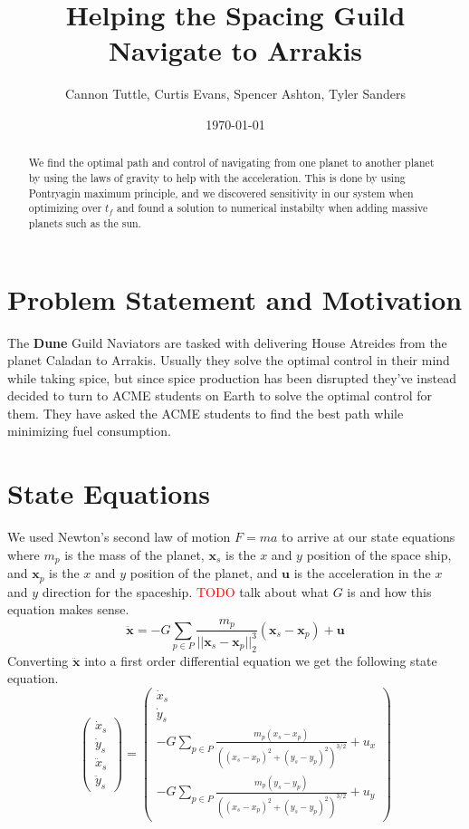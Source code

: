 \documentclass[11pt]{amsart}
\begin{document}
\title{Helping the Spacing Guild Navigate to Arrakis}
\author{Cannon Tuttle, Curtis Evans, Spencer Ashton, Tyler Sanders}

\date{\today}

\begin{abstract}
    We find the optimal path and control of navigating from one planet to another planet by using the laws of gravity to help with 
    the acceleration. This is done by using Pontryagin maximum principle, and we discovered sensitivity in our system when optimizing over $t_f$ and found a solution to numerical instabilty when 
    adding massive planets such as the sun. 
\end{abstract}

\maketitle

\section{Problem Statement and Motivation}
The \textbf{Dune} Guild Naviators are tasked with delivering House Atreides from the planet Caladan to Arrakis. Usually they solve the optimal control in their mind while taking spice, but since spice production
has been disrupted they've instead decided to turn to ACME students on Earth to solve the optimal control for them. They have asked the ACME students to find the best path while minimizing fuel consumption. 


\section{State Equations}
We used Newton's second law of motion $F=ma$ to arrive at our state equations where $m_p$ is the mass of the planet, $\mathbf{x}_s$ is the $x$ and $y$ position of the space ship, and $\mathbf{x}_p$ is the $x$
and $y$ position of the planet, and $\mathbf{u}$ is the acceleration in the $x$ and $y$ direction for the spaceship. \textcolor{red}{TODO} talk about what $G$ is and how this equation makes sense.
\[\ddot{\mathbf{x}} = -G\sum_{p\in{P}}^{}\frac{m_p}{||\mathbf{x}_s-\mathbf{x}_p||_2^3}(\mathbf{x}_s-\mathbf{x}_p) + \mathbf{u}\]
Converting $\ddot{\mathbf{x}}$ into a first order differential equation we get the following state equation. 
\[\begin{pmatrix}
    \dot{x}_s \\
    \dot{y}_s \\
    \ddot{x}_s\\
    \ddot{y}_s 
\end{pmatrix} = \begin{pmatrix}
    \dot{x}_s \\
    \dot{y}_s \\
    -G\sum_{p\in{P}}^{}\frac{m_p(x_s - x_p)}{((x_s-x_p)^2+(y_s-y_p)^2)^{3/2}} + u_x \\
    -G\sum_{p\in{P}}^{}\frac{m_p(y_s - y_p)}{((x_s-x_p)^2+(y_s-y_p)^2)^{3/2}} + u_y
\end{pmatrix}\]
\end{document}
